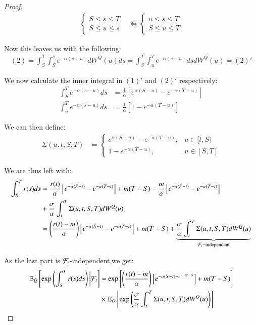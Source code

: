 \begin{proof}
\begin{align*}
\begin{cases}
 S \leq s \leq T \\ 
 S \leq u \leq s
\end{cases}
&\iff
\begin{cases}
 u \leq s \leq T \\ 
 S \leq u \leq T
\end{cases}
\end{align*}

Now this leaves us with the following: 
\begin{align*}
(2) =\int_{S}^{T}\int_{S}^{s}e^{-\alpha(s-u)}dW^{Q}(u)ds 
=
\int_{S}^{T}\int_{u}^{T}e^{-\alpha(s-u)}dsdW^{Q}(u) = (2)'
\end{align*}

We now calculate the inner integral in $(1)'$ and $(2)'$ respectively: 
\begin{align*}
\int_{S}^{T}e^{-\alpha(s-u)}ds &= \frac{1}{\alpha}\left[
e^{\alpha(S-u)}-e^{-\alpha(T-u)}
\right] \\ 
\int_{u}^{T}e^{-\alpha(s-u)}ds &= \frac{1}{\alpha}\left[
1 -e^{-\alpha(T-u)}
\right]
\end{align*}

We can then define: 
\begin{align*}
\Sigma(u,t,S,T) &= 
    \begin{cases}
      e^{\alpha(S-u)}-e^{-\alpha(T-u)},  & u \in [t,S)\\
      1 -e^{-\alpha(T-u)}, & u\in [S,T]
    \end{cases}
\end{align*}

We are thus left with: 
\begin{align}
\label{eq: Vasicek_closed_expr_3M_SOFR}
\int_{S}^{T}r(s)ds &= \frac{r(t)}{\alpha}\left[
e^{-\alpha(S-t)} - e^{-\alpha(T-t)}
\right]   
+ m(T-S) - \frac{m}{\alpha}\left[
e^{-\alpha(S-t)} - e^{-\alpha(T-t)}
\right] \nonumber \\
&+ \frac{\sigma}{\alpha}\int_{t}^{T}\Sigma(u,t,S,T)dW^{Q}(u)\nonumber \\ 
&= 
\left(
\frac{r(t)-m}{\alpha}
\right)
\left[
e^{-\alpha(S-t)} - e^{-\alpha(T-t)}
\right]
+ m(T-S) 
+ 
\underbrace{
\frac{\sigma}{\alpha}\int_{t}^{T}\Sigma(u,t,S,T)dW^{Q}(u)
}_{\mathcal{F}_{t}-\text{independent}}
\end{align}


As the last part is $\mathcal{F}_{t}$-independent,we get: 
\begin{align*}
\mathbb{E}_{Q}\left[
\exp\left(
\int_{S}^{T}r(s)ds
\right)\bigg{|}\mathcal{F}_{t}
\right] 
&= 
\exp\left[
\left(
\frac{r(t)-m}{\alpha}
\right)
\left[
e^{-\alpha(S-t) - e^{-\alpha(T-t)}}
\right]
+ m(T-S) 
\right] \\
&\times  
\mathbb{E}_{Q}\left[
\exp\left(
\frac{\sigma}{\alpha}\int_{t}^{T}\Sigma(u,t,S,T)dW^{Q}(u)
\right)
\right]
\end{align*}


\end{proof}
